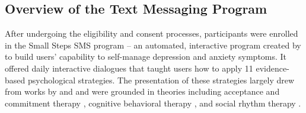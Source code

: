 \subsection{Overview of the Text Messaging Program}

After undergoing the eligibility and consent processes, participants were enrolled in the Small Steps SMS program \cite{meyerhoff2024small} -- an automated, interactive program created by \citet{meyerhoff2024small} to build users' capability to self-manage depression and anxiety symptoms.  It offered daily interactive dialogues that taught users how to apply 11 evidence-based psychological strategies. The presentation of these strategies largely drew from works by \citet{kornfield2022involving} and \citet{meyerhoff2022system} 
and were grounded in theories including acceptance and commitment therapy \cite{hayes2006acceptance}, cognitive behavioral therapy \cite{willson2019cognitive}, and social rhythm therapy \cite{frank2022interpersonal}.


